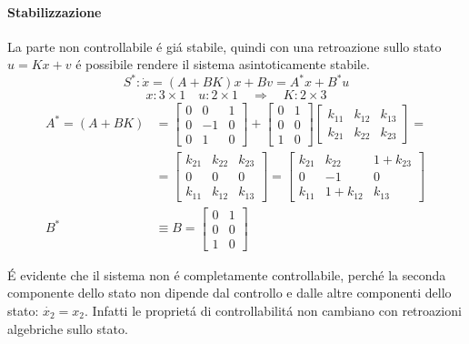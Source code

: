 \begin{mdframed}[style=Exercise]
\begin{Exercise}[title={Studio completo del sistema e stabilizzazione}, difficulty=3]
			\paragraph{Stabilizzazione}
				La parte non controllabile \'e gi\'a stabile, quindi con una retroazione sullo stato $ u = Kx + v $ \'e possibile rendere il sistema asintoticamente stabile.
				\[ S^{*}: \dot x = (A+BK)x + Bv = A^{*}x + B^{*}u \]
				\[ x: 3 \times 1 \quad u: 2 \times 1 \quad\Rightarrow\quad K: 2 \times 3 \]
				\[
					\begin{aligned}
						A^{*} = (A+BK) &=
						\begin{bmatrix}
							0 & 0 & 1\\
							0 & -1 & 0\\
							0 & 1 & 0
						\end{bmatrix} +
						\begin{bmatrix}
							0 & 1\\
							0 & 0\\
							1 & 0
						\end{bmatrix}
						\begin{bmatrix}
							k_{11} & k_{12} & k_{13}\\
							k_{21} & k_{22} & k_{23}
						\end{bmatrix} =
						\\
						&= \begin{bmatrix}
							k_{21} & k_{22} & k_{23}\\
							0 & 0 & 0\\
							k_{11} & k_{12} & k_{13}
						\end{bmatrix} =
						\begin{bmatrix}
							k_{21} & k_{22} & 1 + k_{23}\\
							0 & -1 & 0\\
							k_{11} & 1 + k_{12} & k_{13}
						\end{bmatrix}
						\\
						B^{*} &\equiv B =
						\begin{bmatrix}
							0 & 1\\
							0 & 0\\
							1 & 0
						\end{bmatrix}
					\end{aligned}
				\]
				
				\'E evidente che il sistema non \'e completamente controllabile, perch\'e la seconda componente dello stato non dipende dal controllo e dalle altre componenti dello stato: $ \dot{x_2} = x_2 $. Infatti le propriet\'a di controllabilit\'a non cambiano con retroazioni algebriche sullo stato.
				

\end{Exercise}
\end{mdframed}
